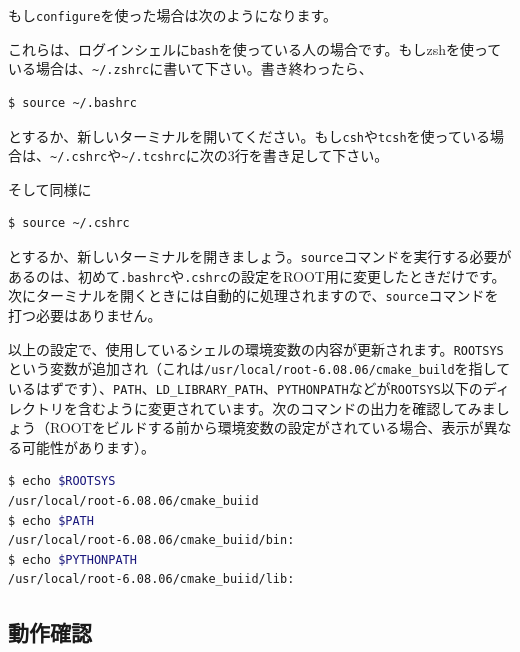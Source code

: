 もし\texttt{configure}を使った場合は次のようになります。
\begin{NoFloat}

\end{NoFloat}

これらは、ログインシェルに\texttt{bash}を使っている人の場合です。もしzshを使っている場合は、\texttt{\~{}/.zshrc}に書いて下さい。書き終わったら、
\begin{lstlisting}[language=bash]
$ source ~/.bashrc
\end{lstlisting}
とするか、新しいターミナルを開いてください。もし\texttt{csh}や\texttt{tcsh}を使っている場合は、\texttt{\~{}/.cshrc}や\texttt{\~{}/.tcshrc}に次の3行を書き足して下さい。
\begin{NoFloat}

\end{NoFloat}
そして同様に
\begin{lstlisting}[language=bash]
$ source ~/.cshrc
\end{lstlisting}
とするか、新しいターミナルを開きましょう。\texttt{source}コマンドを実行する必要があるのは、初めて\texttt{.bashrc}や\texttt{.cshrc}の設定をROOT用に変更したときだけです。次にターミナルを開くときには自動的に処理されますので、\texttt{source}コマンドを打つ必要はありません。

以上の設定で、使用しているシェルの環境変数の内容が更新されます。\texttt{ROOTSYS}という変数が追加され（これは\texttt{/usr/local/root-6.08.06/cmake\_build}を指しているはずです）、\texttt{PATH}、\texttt{LD\_LIBRARY\_PATH}、\texttt{PYTHONPATH}などが\texttt{ROOTSYS}以下のディレクトリを含むように変更されています。次のコマンドの出力を確認してみましょう（ROOTをビルドする前から環境変数の設定がされている場合、表示が異なる可能性があります）。
\begin{lstlisting}[language=bash]
$ echo $ROOTSYS
/usr/local/root-6.08.06/cmake_buiid
$ echo $PATH
/usr/local/root-6.08.06/cmake_buiid/bin:
$ echo $PYTHONPATH
/usr/local/root-6.08.06/cmake_buiid/lib:
\end{lstlisting}

\subsection{動作確認}

